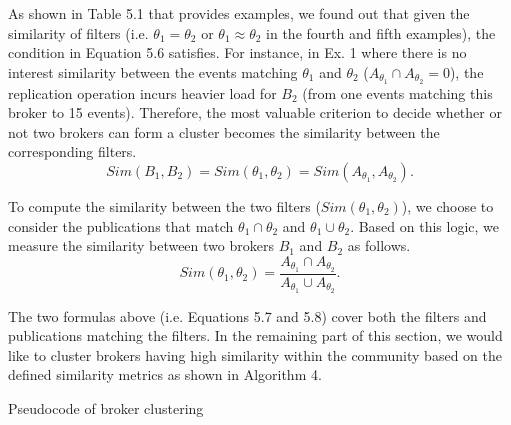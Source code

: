 As shown in Table 5.1 that provides examples, we found out that given the similarity of filters (i.e. $\theta_1 = \theta_2$ or $\theta_1 \approx \theta_2$ in the fourth and fifth examples), the condition in Equation 5.6 satisfies. For instance, in Ex. 1 where there is no interest similarity between the events matching $\theta_1$ and $\theta_2$ ($A_{\theta_1} \cap A_{\theta_2}=0$), the replication operation incurs heavier load for $B_2$ (from one events matching this broker to 15 events). Therefore, the most valuable criterion to decide whether or not two brokers can form a cluster becomes the similarity between the corresponding filters.
\begin{equation}
Sim(B_1, B_2)=Sim(\theta_1, \theta_2)=Sim(A_{\theta_1}, A_{\theta_2}).
\end{equation}

To compute the similarity between the two filters ($Sim(\theta_1, \theta_2)$), we choose to consider the publications that match $\theta_1 \cap \theta_2$ and $\theta_1 \cup \theta_2$. Based on this logic, we measure the similarity between two brokers $B_1$ and $B_2$ as follows.
\begin{equation}
Sim(\theta_1, \theta_2)=\frac{A_{\theta_1} \cap A_{\theta_2}}{A_{\theta_1} \cup A_{\theta_2}}.
\end{equation}

The two formulas above (i.e. Equations 5.7 and 5.8) cover both the filters and publications matching the filters. In the remaining part of this section, we would like to cluster brokers having high similarity within the community based on the defined similarity metrics as shown in Algorithm 4.

\begin{algorithm}
\caption{Pseudocode of broker clustering}
\label{alg:chap5_alg02}
\end{algorithm}

